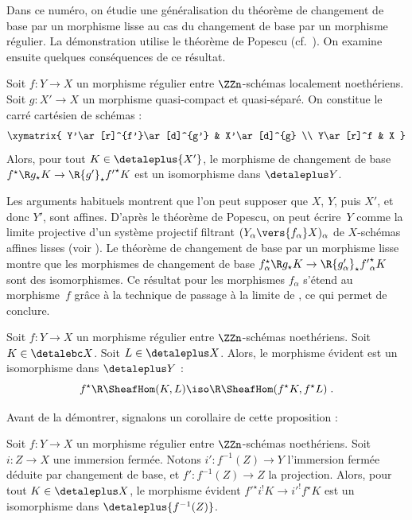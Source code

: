 \documentclass[10pt]{../fichiers-configuration-latex/smfart}
\begin{document}
Dans ce numéro, on étudie une généralisation du théorème de changement de
base par un morphisme lisse au cas du changement de base par un
morphisme régulier.
La démonstration utilise le théorème de
Popescu (cf.~\cite{NPD@Swan}).
On examine ensuite quelques conséquences de ce résultat.

\begin{proposition2}\label{17-proposition-changement-de-base-regulier}
Soit $f\colon Y\to X$ un morphisme régulier entre $\ZZn$-schémas
localement noethériens. Soit $g\colon X'\to X$ un
morphisme quasi-compact et quasi-séparé. On constitue le carré cartésien de
schémas :
\[
\xymatrix{
Y'\ar[r]^{f'}\ar[d]^{g'} & X'\ar[d]^{g} \\
Y\ar[r]^f & X
}
\]
Alors, pour tout $K\in \detaleplus {X'}$, le morphisme de changement de base
$f^\star \R g_\star K\to \R {g'}_\star {f'}^\star K$ est un
isomorphisme dans $\detaleplus Y$.
\end{proposition2}

Les arguments habituels montrent que l'on peut supposer que $X$, $Y$, puis
$X'$, et donc $Y'$, sont affines. D'après le théorème de Popescu, on peut
écrire $Y$ comme la limite projective d'un système projectif filtrant
$(Y_{\alpha}\vers {f_\alpha} X)_\alpha$ de $X$-schémas 
affines lisses (voir ). Le théorème de changement de
base par un morphisme lisse  montre que les morphismes de
changement de base $f_\alpha^\star \R g_\star K\to 
\R {g'_\alpha}_\star {f'}_\alpha^\star K$ sont des isomorphismes.
Ce résultat pour les morphismes
$f_\alpha$ s'étend au morphisme $f$ grâce à la technique de passage à la
limite de , ce qui permet de conclure.

\begin{proposition2}\label{17-proposition-rhom-morphismes-reguliers}
Soit $f\colon Y\to X$ un morphisme régulier
entre $\ZZn$-schémas noethériens.
Soit $K\in\detalebc X$. Soit $L\in \detaleplus X$. Alors, le morphisme évident est
un isomorphisme dans $\detaleplus Y$ :
\[f^\star\R\SheafHom(K,L)\iso \R\SheafHom(f^\star K,f^\star
L)\;\text{.}\]
\end{proposition2}

Avant de la démontrer, signalons un corollaire de cette proposition :

\begin{corollaire2}\label{17-corollaire-cb-regulier-pour-cohomologie-a-supports}
Soit $f\colon Y\to X$ un morphisme régulier
entre $\ZZn$-schémas noethériens. Soit $i\colon Z\to X$ une 
immersion
fermée. Notons $i'\colon f^{-1}(Z)\to Y$ l'immersion fermée déduite par
changement de base, et $f'\colon f^{-1}(Z)\to Z$ la projection.
Alors, pour tout $K\in \detaleplus X$, le morphisme évident
${f'}^\star i^! K\to {i'}^!f^\star K$ est un isomorphisme dans $\detaleplus
{f^{-1}(Z)}$.
\end{corollaire2}
\end{document}
